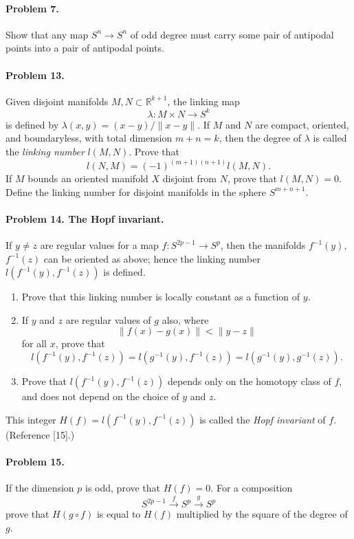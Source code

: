 \paragraph{Problem 7.}
Show that any map $S^n \to S^n$ of odd degree must carry some pair of antipodal points into a pair of antipodal points.

\paragraph{Problem 13.}
Given disjoint manifolds $M, N \subset \mathbb{R}^{k+1}$, the linking map
\[
\lambda : M \times N \to S^k
\]
is defined by $\lambda(x, y) = (x - y) / \|x - y\|$. If $M$ and $N$ are compact, oriented, and boundaryless, with total dimension $m + n = k$, then the degree of $\lambda$ is called the \emph{linking number} $l(M, N)$. Prove that
\[
l(N, M) = (-1)^{(m+1)(n+1)} l(M, N).
\]
If $M$ bounds an oriented manifold $X$ disjoint from $N$, prove that $l(M, N) = 0$. Define the linking number for disjoint manifolds in the sphere $S^{m+n+1}$.

\paragraph{Problem 14. The Hopf invariant.}
If $y \neq z$ are regular values for a map $f : S^{2p-1} \to S^p$, then the manifolds $f^{-1}(y)$, $f^{-1}(z)$ can be oriented as above; hence the linking number $l(f^{-1}(y), f^{-1}(z))$ is defined.

\begin{enumerate}
\item[(a)] Prove that this linking number is locally constant as a function of $y$.
\item[(b)] If $y$ and $z$ are regular values of $g$ also, where
\[
\|f(x) - g(x)\| < \|y - z\|
\]
for all $x$, prove that
\[
l(f^{-1}(y), f^{-1}(z)) = l(g^{-1}(y), f^{-1}(z)) = l(g^{-1}(y), g^{-1}(z)).
\]
\item[(c)] Prove that $l(f^{-1}(y), f^{-1}(z))$ depends only on the homotopy class of $f$, and does not depend on the choice of $y$ and $z$.
\end{enumerate}

This integer $H(f) = l(f^{-1}(y), f^{-1}(z))$ is called the \emph{Hopf invariant} of $f$. (Reference [15].)

\paragraph{Problem 15.}
If the dimension $p$ is odd, prove that $H(f) = 0$. For a composition
\[
S^{2p-1} \xrightarrow{f} S^p \xrightarrow{g} S^p
\]
prove that $H(g \circ f)$ is equal to $H(f)$ multiplied by the square of the degree of $g$.

